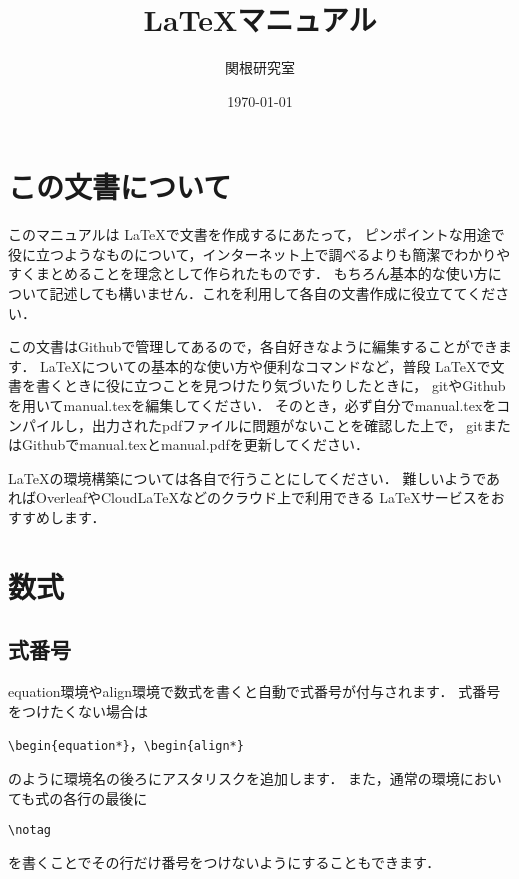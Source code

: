 \documentclass[a4paper,11pt,titlepage]{jsarticle}
\theoremstyle{definition}
\begin{document}
\title{\LaTeX マニュアル}
\author{関根研究室}
\date{\today}
\maketitle

\tableofcontents

\newpage

\section{この文書について}

このマニュアルは \LaTeX で文書を作成するにあたって，
ピンポイントな用途で役に立つようなものについて，インターネット上で調べるよりも簡潔でわかりやすくまとめることを理念として作られたものです．
もちろん基本的な使い方について記述しても構いません．これを利用して各自の文書作成に役立ててください．

この文書はGithubで管理してあるので，各自好きなように編集することができます．
\LaTeX についての基本的な使い方や便利なコマンドなど，普段 \LaTeX で文書を書くときに役に立つことを見つけたり気づいたりしたときに，
gitやGithubを用いてmanual.texを編集してください．
そのとき，必ず自分でmanual.texをコンパイルし，出力されたpdfファイルに問題がないことを確認した上で，
gitまたはGithubでmanual.texとmanual.pdfを更新してください．

\LaTeX の環境構築については各自で行うことにしてください．
難しいようであればOverleafやCloudLaTeXなどのクラウド上で利用できる \LaTeX サービスをおすすめします．

\section{数式}

\subsection{式番号}

equation環境やalign環境で数式を書くと自動で式番号が付与されます．
式番号をつけたくない場合は
\begin{center}
    \verb|\begin{equation*}|，\verb|\begin{align*}|
\end{center}
のように環境名の後ろにアスタリスクを追加します．
また，通常の環境においても式の各行の最後に
\begin{center}
    \verb|\notag|
\end{center}
を書くことでその行だけ番号をつけないようにすることもできます．
\end{document}

